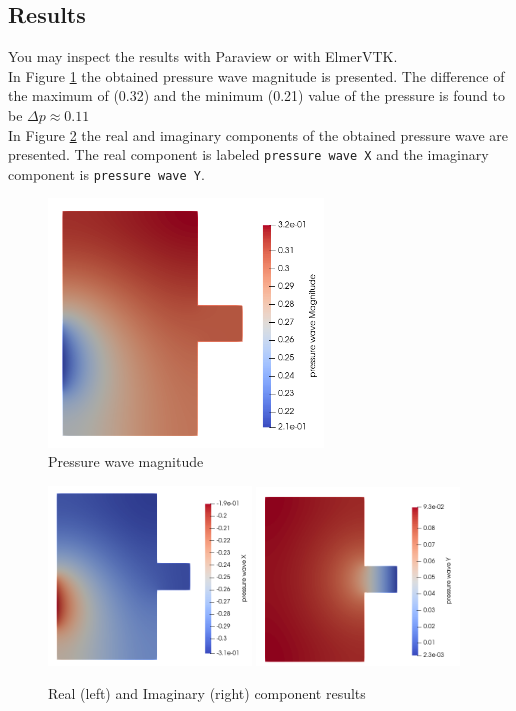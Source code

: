 \subsection*{Results}

You may inspect the results with Paraview or with ElmerVTK.\\

In Figure \ref{fg:press-mag} the obtained pressure wave magnitude is presented.
 The difference of the maximum of (0.32) and the minimum (0.21) value of the
pressure is found to be $\Delta p \approx 0.11$\\

In Figure \ref{fg:press-xy} the real and imaginary components of the obtained
pressure wave are presented.  The real component is labeled \texttt{pressure wave X}
and the imaginary component is \texttt{pressure wave Y}.

\begin{figure}[H]
\centering
\includegraphics[width=0.65\textwidth]{press-mag}
\caption{Pressure wave magnitude}\label{fg:press-mag}
\end{figure} 

\begin{figure}[H]
\centering
\includegraphics[width=0.48\textwidth]{press-x}
\includegraphics[width=0.48\textwidth]{press-y}
\caption{Real (left) and Imaginary (right) component results}\label{fg:press-xy}
\end{figure} 

